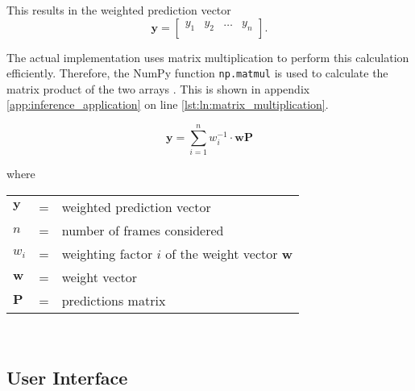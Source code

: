 This results in the weighted prediction vector
\begin{equation}
  \boldsymbol{y} =
  \begin{bmatrix}
    y_{1} & y_{2} & \dots & y_{n} \\
  \end{bmatrix}.
  \label{eq:weighted_prediction_vector}
\end{equation}

The actual implementation uses matrix multiplication to perform this calculation efficiently.
Therefore, the NumPy function \texttt{np.matmul} is used to calculate the matrix product of the two arrays \cite{inf_numpy_matmul}.
This is shown in appendix \ref{app:inference_application} on line \ref{lst:ln:matrix_multiplication}.

\begin{equation}
  \boldsymbol{y} = \sum\limits_{i=1}^{n} w_i^{-1} \cdot \boldsymbol{w} \boldsymbol{P}
  \label{eq:weighted_prediction}
\end{equation}

where

\begin{tabular}{lll}
  $\boldsymbol{y}$ & = & weighted prediction vector \\ %
  $n$ & = & number of frames considered \\
  $w_i$ & = & weighting factor $i$ of the weight vector $\boldsymbol{w}$ \\
  $\boldsymbol{w}$ & = & weight vector \\ %
  $\boldsymbol{P}$ & = & predictions matrix \\ %
\end{tabular}
\\

\subsection{User Interface}
\label{subsec:inference:app:ui}

